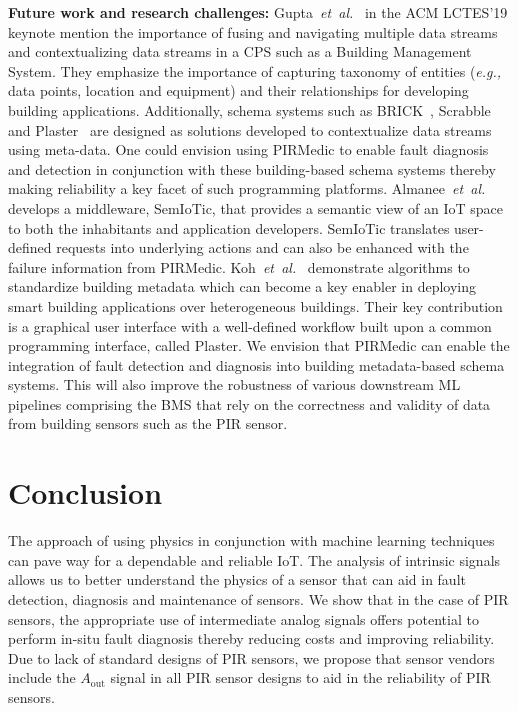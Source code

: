 \documentclass[manuscript]{acmart}
\newcommand{\eg}{{\it e.g.,}\xspace}
\newcommand{\etal}{{\it et~al.}\xspace}
\newcommand{\aout}{$A_{\text{out}}$\xspace}
\newcommand{\sol}{{PIRMedic}\xspace}
\begin{document}
\noindent \textbf{Future work and research challenges:} Gupta~\etal~\cite{Gupta2019NewMA} in the ACM LCTES'19 keynote mention the importance of fusing and navigating multiple data streams and contextualizing data streams in a CPS such as a Building Management System. They emphasize the importance of capturing taxonomy of entities (\eg data points, location and equipment) and their relationships for developing building applications. Additionally, schema systems such as BRICK~\cite{balaji2016brick}, Scrabble~\cite{10.1145/3276774.3276795} and Plaster~\cite{10.1145/3276774.3276794} are designed as solutions developed to contextualize data streams using meta-data. One could envision using \sol to enable fault diagnosis and detection in conjunction with these building-based schema systems thereby making reliability a key facet of such programming platforms. Almanee~\etal~\cite{almanee2019demo} develops a middleware, SemIoTic, that provides a semantic view of an IoT space to both the inhabitants and application developers. SemIoTic translates user-defined requests into underlying actions and can also be enhanced with the failure information from \sol. Koh~\etal~\cite{koh2019interactive} demonstrate algorithms to standardize building metadata which can become a key enabler in deploying smart building applications over heterogeneous buildings. Their key contribution is a graphical user interface with a well-defined workflow built upon a common programming interface, called Plaster. We envision that \sol can enable the integration of fault detection and diagnosis into building metadata-based schema systems. This will also improve the robustness of various downstream ML pipelines comprising the BMS that rely on the correctness and validity of data from building sensors such as the PIR sensor.




 


\section{Conclusion} 
\label{sec:concl}
The approach of using physics in conjunction with machine learning techniques can pave way for a dependable and reliable IoT. The analysis of intrinsic signals allows us to better understand the physics of a sensor that can aid in fault detection, diagnosis and maintenance of sensors. We show that in the case of PIR sensors, the appropriate use of intermediate analog signals offers potential to perform in-situ fault diagnosis thereby reducing costs and improving reliability. Due to lack of standard designs of PIR sensors, we propose that sensor vendors include the \aout signal in all PIR sensor designs to aid in the reliability of PIR sensors.
\end{document}
